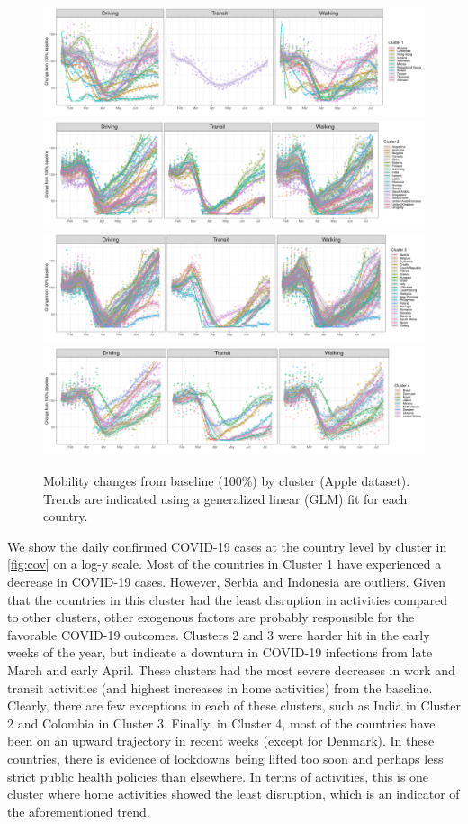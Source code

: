 \documentclass[titlepage,oneside,12pt]{article}
\newcommand{\?}{\stackrel{?}{=}}
\begin{document}
\begin{figure}[h!]
  \centering
  \includegraphics[width=.9\textwidth]{c1-mobility}
  \includegraphics[width=.9\textwidth]{c2-mobility}
  \includegraphics[width=.9\textwidth]{c3-mobility}
  \includegraphics[width=.9\textwidth]{c4-mobility}
  \caption{Mobility changes from baseline (100\%) by cluster (Apple dataset). Trends are indicated using a generalized linear (GLM) fit for each country.}
  \label{fig:mob}
\end{figure}


We show the daily confirmed COVID-19 cases at the country level by cluster in \autoref{fig:cov} on a log-y scale.
Most of the countries in Cluster 1 have experienced a decrease in COVID-19 cases.
However, Serbia and Indonesia are outliers.
Given that the countries in this cluster had the least disruption in activities compared to other clusters, other exogenous factors are probably responsible for the favorable COVID-19 outcomes.
Clusters 2 and 3 were harder hit in the early weeks of the year, but indicate a downturn in COVID-19 infections from late March and early April.
These clusters had the most severe decreases in work and transit activities (and highest increases in home activities) from the baseline.
Clearly, there are few exceptions in each of these clusters, such as India in Cluster 2 and Colombia in Cluster 3.
Finally, in Cluster 4, most of the countries have been on an upward trajectory in recent weeks (except for Denmark).
In these countries, there is evidence of lockdowns being lifted too soon and perhaps less strict public health policies than elsewhere.
In terms of activities, this is one cluster where home activities showed the least disruption, which is an indicator of the aforementioned trend.
\end{document}
